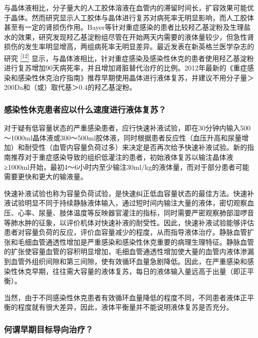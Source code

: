 与晶体液相比，分子量大的人工胶体溶液在血管内的滞留时间长，扩容效果可能优于晶体。然而研究显示人工胶体与晶体进行复苏对病死率无明显影响，而人工胶体甚至有一定的肾损伤作用。Bayer等针对重症感染的患者比较羟乙基淀粉及生理盐水的效果，研究发现羟乙基淀粉组尽管在开始两天内需要的液体量较少，但急性肾损伤的发生率明显增高，两组病死率无明显差异。最近发表在新英格兰医学杂志的研究
\protect\hyperlink{text00008.htmlux5cux23ch12-7}{\textsuperscript{{[}12{]}}}
显示，与晶体液相比，针对重症感染及感染性休克的患者使用羟乙基淀粉进行复苏增加90天病死率，并且增加肾脏替代治疗的比例。2012年最新的《重症感染和感染性休克治疗指南》推荐早期使用晶体进行液体复苏，并建议不用分子量＞200Da和（或）取代基＞0.4的羟乙基淀粉。

\subsubsection{感染性休克患者应以什么速度进行液体复苏？}

对于疑有低容量状态的严重感染患者，应行快速补液试验，即在30分钟内输入500～1000ml晶体液或300～500ml胶体液，同时根据患者反应性（血压升高和尿量增加）和耐受性（血管内容量负荷过多）来决定是否再次给予快速补液试验。新的指南推荐对于重症感染导致的组织低灌注的患者，初始液体复苏以输注晶体液≥1000ml开始，最初4～6小时内至少输注30ml/kg的液体量，而对于部分患者可能需要更快和更大的输液量。

快速补液试验也称为容量负荷试验，是快速纠正低血容量状态的最佳方法。快速补液试验明显不同于持续静脉液体输入，通过短时间内输注大量的液体，密切观察血压、心率、尿量、肢体温度等反映器官灌注的指标，同时需要严密观察肺部湿啰音等肺水肿的征象，以评价机体对快速补液的耐受性。因此，快速补液试验能够评估患者对容量负荷的反应，评价血容量减少的程度，从而指导液体治疗。静脉血管扩张和毛细血管通透性增加是严重感染和感染性休克重要的病理生理特征。静脉血管的扩张使容量血管的容积明显增加，毛细血管通透性增加使大量的血管内液体渗漏到血管外组织间隙和第三间隙，使有效循环血量急剧降低。因此，在严重感染和感染性休克早期，往往需大容量的液体复苏，每日的液体输入量远高于出量（即正平衡）。

当然，由于不同感染性休克患者有效循环血量降低的程度不同，不同患者液体正平衡的程度就有很大差异，因此，液体平衡量并不能说明液体复苏是否充分。

\subsubsection{何谓早期目标导向治疗？}

